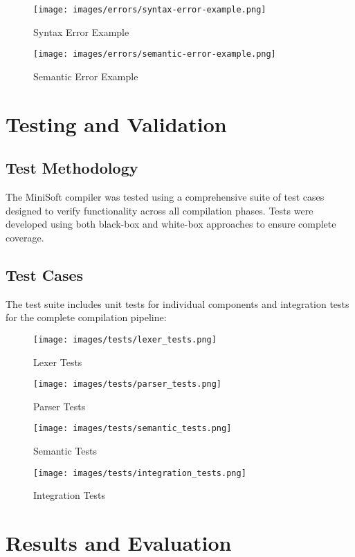 \documentclass[12pt,a4paper]{article}
\begin{document}
\begin{figure}[H]
	\centering
	\texttt{[image: images/errors/syntax-error-example.png]}
	\caption{Syntax Error Example}
\end{figure}

\begin{figure}[H]
	\centering
	\texttt{[image: images/errors/semantic-error-example.png]}
	\caption{Semantic Error Example}
\end{figure}

\section{Testing and Validation}
\subsection{Test Methodology}
The MiniSoft compiler was tested using a comprehensive suite of test cases designed to verify functionality across all compilation phases. Tests were developed using both black-box and white-box approaches to ensure complete coverage.
\subsection{Test Cases}
The test suite includes unit tests for individual components and integration tests for the complete compilation pipeline:

\begin{figure}[H]
	\centering
	\texttt{[image: images/tests/lexer\_tests.png]}
	\caption{Lexer Tests}
\end{figure}


\begin{figure}[H]
	\centering
	\texttt{[image: images/tests/parser\_tests.png]}
	\caption{Parser Tests}
\end{figure}

\begin{figure}[H]
	\centering
	\texttt{[image: images/tests/semantic\_tests.png]}
	\caption{Semantic Tests}
\end{figure}

\begin{figure}[H]
	\centering
	\texttt{[image: images/tests/integration\_tests.png]}
	\caption{Integration Tests}
\end{figure}

\newpage
\section{Results and Evaluation}
\end{document}
